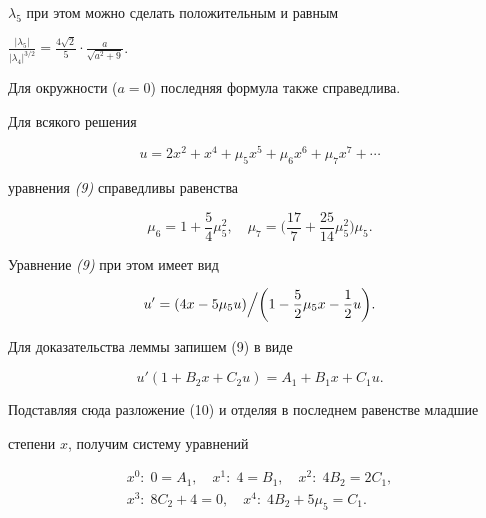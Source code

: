 $\lambda_5$ при этом можно сделать положительным и равным 


$\frac{|\lambda_5|}{|\lambda_4|^{3/2}}=\frac{4\sqrt 2}{5}\cdot 


\frac{a}{\sqrt{a^2+9}}$. 


 


\begin{notenonum} 


Для окружности ($a=0$) последняя формула также справедлива. 


\end{notenonum} 


 


\begin{lemnonum} 


Для всякого решения 


\begin{equation} 


u=2x^2+x^4+\mu_5x^5+\mu_6x^6+\mu_7x^7+\dotsb 


\end{equation} 


уравнения {\em (9)} справедливы равенства 


$$ 


\mu_6=1+\frac{5}{4}\mu_5^2,\quad 


\mu_7=\biggl(\frac{17}{7}+\frac{25}{14}\mu^2_5\biggr)\mu_5. 


$$ 


Уравнение {\em (9)} при этом имеет вид 


$$ 


u'=(4x-5\mu_5u)\Bigl.\Bigr/\biggl(1-\frac{5}{2}\mu_5x- 


\frac{1}{2}u\biggr). 


$$ 


\end{lemnonum} 


 


Для доказательства леммы запишем (9) в виде 


$$ 


u'(1+B_2x+C_2u)=A_1+B_1x+C_1u. 


$$ 


Подставляя сюда разложение (10) и отделяя в последнем равенстве младшие 


степени $x$, получим систему уравнений 


\begin{gather*} 


x^0:\;0=A_1,\quad x^1:\;4=B_1,\quad x^2:\;4B_2=2C_1,\\ 


x^3:\; 8C_2+4=0,\quad x^4:\; 4B_2+5\mu_5=C_1. 


\end{gather*} 


